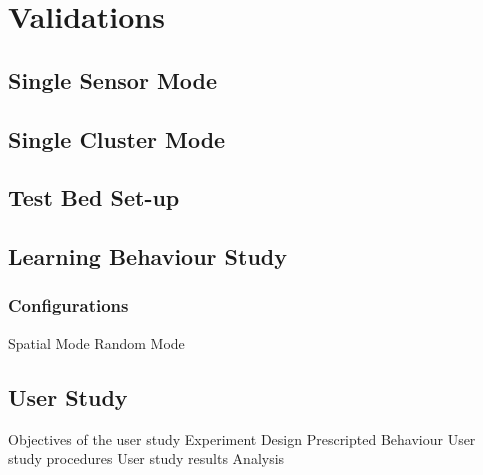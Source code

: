 \chapter{Validations} \label{chap:validations}
\section{Single Sensor Mode}
\section{Single Cluster Mode}

\section{Test Bed Set-up}
\section{Learning Behaviour Study}

\subsection{Configurations}

Spatial Mode
Random Mode


\section{User Study}
Objectives of the user study
Experiment Design
Prescripted Behaviour
User study procedures
User study results
Analysis
